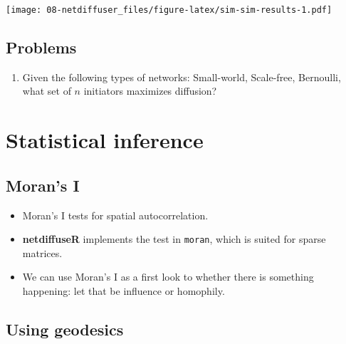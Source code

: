 \documentclass[]{book}
\providecommand{\tightlist}{%
  \setlength{\itemsep}{0pt}\setlength{\parskip}{0pt}}
\begin{document}
\texttt{[image: 08-netdiffuser\_files/figure-latex/sim-sim-results-1.pdf]}

\hypertarget{problems-1}{%
\subsection{Problems}\label{problems-1}}

\begin{enumerate}
\def\labelenumi{\arabic{enumi}.}
\tightlist
\item
  Given the following types of networks: Small-world, Scale-free, Bernoulli,
  what set of \(n\) initiators maximizes diffusion?
\end{enumerate}

\hypertarget{statistical-inference}{%
\section{Statistical inference}\label{statistical-inference}}

\hypertarget{morans-i}{%
\subsection{Moran's I}\label{morans-i}}

\begin{itemize}
\item
  Moran's I tests for spatial autocorrelation.
\item
  \textbf{netdiffuseR} implements the test in \texttt{moran}, which is suited for sparse matrices.
\item
  We can use Moran's I as a first look to whether there is something happening:
  let that be influence or homophily.
\end{itemize}

\hypertarget{using-geodesics}{%
\subsection{Using geodesics}\label{using-geodesics}}
\end{document}
